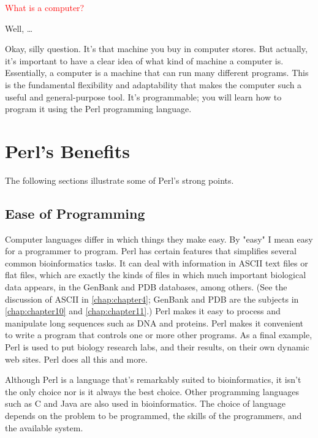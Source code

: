 \textcolor{red}{What is a computer?}

\begin{adjustwidth}{1cm}{}
Well, \ldots

Okay, silly question. It's that machine you buy in computer stores. But actually, it's important to have a clear idea of what kind of machine a computer is. Essentially, a computer is a machine that can run many different programs. This is the fundamental flexibility and adaptability that makes the computer such a useful and general-purpose tool. It's programmable; you will learn how to program it using the Perl programming language. 
\end{adjustwidth}

\section{Perl's Benefits}
The following sections illustrate some of Perl's strong points.

\subsection{Ease of Programming}
Computer languages differ in which things they make easy. By "easy" I mean easy for a programmer to program. Perl has certain features that simplifies several common bioinformatics tasks. It can deal with information in ASCII text files or flat files, which are exactly the kinds of files in which much important biological data appears, in the GenBank and PDB databases, among others. (See the discussion of ASCII in \ref{chap:chapter4}; GenBank and PDB are the subjects in \ref{chap:chapter10} and \ref{chap:chapter11}.) Perl makes it easy to process and manipulate long sequences such as DNA and proteins. Perl makes it convenient to write a program that controls one or more other programs. As a final example, Perl is used to put biology research labs, and their results, on their own dynamic web sites. Perl does all this and more.

Although Perl is a language that's remarkably suited to bioinformatics, it isn't the only choice nor is it always the best choice. Other programming languages such as C and Java are also used in bioinformatics. The choice of language depends on the problem to be programmed, the skills of the programmers, and the available system.

